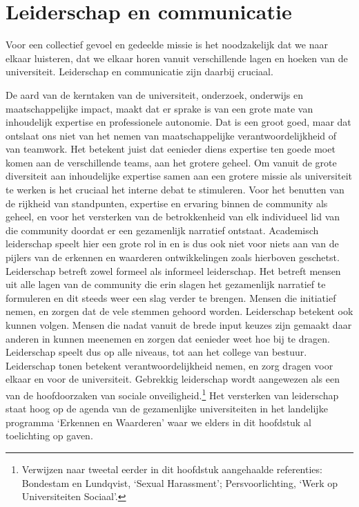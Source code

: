 \documentclass[smallauthor, chapterhaspagenum, nochapterinheader, pagenuminheader,  bigchapnum,medium2, tocpages,  garamond, titleinheader]{jote-book}
\begin{document}
	\section{Leiderschap en communicatie}



	Voor een collectief gevoel en gedeelde missie is het noodzakelijk dat we naar elkaar luisteren, dat we elkaar horen vanuit verschillende lagen en hoeken van de universiteit. Leiderschap en communicatie zijn daarbij cruciaal.



	De aard van de kerntaken van de universiteit, onderzoek, onderwijs en maatschappelijke impact, maakt dat er sprake is van een grote mate van inhoudelijk expertise en professionele autonomie. Dat is een groot goed, maar dat ontslaat ons niet van het nemen van maatschappelijke verantwoordelijkheid of van teamwork. Het betekent juist dat eenieder diens expertise ten goede moet komen aan de verschillende teams, aan het grotere geheel. Om vanuit de grote diversiteit aan inhoudelijke expertise samen aan een grotere missie als universiteit te werken is het cruciaal het interne debat te stimuleren. Voor het benutten van de rijkheid van standpunten, expertise en ervaring binnen de community als geheel, en voor het versterken van de betrokkenheid van elk individueel lid van die community doordat er een gezamenlijk narratief ontstaat. Academisch leiderschap speelt hier een grote rol in en is dus ook niet voor niets aan van de pijlers van de erkennen en waarderen ontwikkelingen zoals hierboven geschetst. Leiderschap betreft zowel formeel als informeel leiderschap. Het betreft mensen uit alle lagen van de community die erin slagen het gezamenlijk narratief te formuleren en dit steeds weer een slag verder te brengen. Mensen die initiatief nemen, en zorgen dat de vele stemmen gehoord worden. Leiderschap betekent ook kunnen volgen. Mensen die nadat vanuit de brede input keuzes zijn gemaakt daar anderen in kunnen meenemen en zorgen dat eenieder weet hoe bij te dragen. Leiderschap speelt dus op alle niveaus, tot aan het college van bestuur. Leiderschap tonen betekent verantwoordelijkheid nemen, en zorg dragen voor elkaar en voor de universiteit. Gebrekkig leiderschap wordt aangewezen als een van de hoofdoorzaken van sociale onveiligheid.\footnote{Verwijzen naar tweetal eerder in dit hoofdstuk aangehaalde referenties: Bondestam en Lundqvist, ‘Sexual Harassment'; Persvoorlichting, ‘Werk op Universiteiten Sociaal'.} Het versterken van leiderschap staat hoog op de agenda van de gezamenlijke universiteiten in het landelijke programma ‘Erkennen en Waarderen' waar we elders in dit hoofdstuk al toelichting op gaven.
\end{document}
